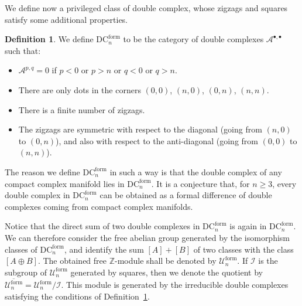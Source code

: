\documentclass[leqno]{article}
\theoremstyle{definition}
\newtheorem{Definition}[equation]{Definition}
\numberwithin{equation}{section}
\begin{document}
We define now a privileged class of double complex, whose zigzags and squares satisfy some additional properties.
\begin{Definition}
\label{dc-acc}
We define $\text{DC}^{\text{form}}_n$ to be the category of double complexes $\mathcal{A}^{\bullet, \bullet}$ such that:
\begin{itemize}
\item $\mathcal{A}^{p, q} = 0$ if $p < 0$ or $p > n$ or $q < 0$ or $q > n$.
\item There are only dots in the corners $(0, 0)$, $(n, 0)$, $(0, n)$, $(n, n)$.
\item There is a finite number of zigzags.
\item The zigzags are symmetric with respect to the diagonal (going from $(n, 0)$ to $(0, n)$), and also with respect to the anti-diagonal (going from $(0, 0)$ to $(n, n)$).
\end{itemize}
\end{Definition}
The reason we define $\text{DC}^{\text{form}}_n$ in such a way is that the double complex of any compact complex manifold lies in $\text{DC}^{\text{form}}_n$. It is a conjecture that, for $n \geqslant 3$, every double complex in $\text{DC}^{\text{form}}_n$ can be obtained as a formal difference of double complexes coming from compact complex manifolds.

Notice that the direct sum of two double complexes in $\text{DC}^{\text{form}}_n$ is again in $\text{DC}^{\text{form}}_n$. We can therefore consider the free abelian group generated by the isomorphism classes of $\text{DC}^{\text{form}}_n$, and identify the sum $[A] + [B]$ of two classes with the class $[A \oplus B]$. The obtained free $\mathbb{Z}$-module shall be denoted by $\mathcal{U}^{\text{form}}_n$. If $\mathcal{I}$ is the subgroup of $\mathcal{U}^{\text{form}}_n$ generated by squares, then we denote the quotient by $\overline{\mathcal{U}^{\text{form}}_n} = \mathcal{U}^{\text{form}}_n / \mathcal{I}$. This module is generated by the irreducible double complexes satisfying the conditions of Definition~\ref{dc-acc}.
\end{document}
